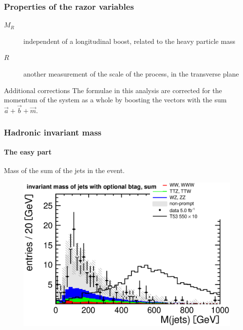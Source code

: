 \documentclass[ukenglish]{beamer}
\begin{document}
\begin{frame}
    \frametitle{Properties of the razor variables}
    \begin{description}
        \item[$M_R$] independent of a longitudinal boost, related to the
            heavy particle mass
        \item[$R$] another measurement of the scale of the process, in the transverse plane
    \end{description}

    \begin{block}
        {Additional corrections}
        The formulae in this analysis are corrected for the momentum of the
        system as a whole by boosting the vectors with the sum $\vec{a} + \vec{b} +
        \vec{m}.$
    \end{block}
\end{frame}

\begin{frame}
    \frametitle{Hadronic invariant mass}
    \framesubtitle{The easy part}
    \begin{block}{}
        Mass of the sum of the jets in the event.
    \end{block}
        \begin{figure}[h]
            \centering
            \includegraphics[width=.7\textwidth]{had_mass_optional_btag_sum.eps}
        \end{figure}
\end{frame}
\end{document}
